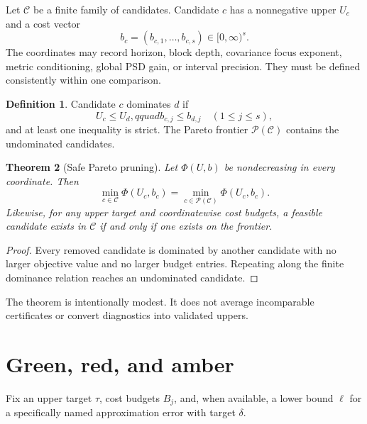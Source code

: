 \documentclass[11pt]{article}
\newtheorem{theorem}{Theorem}[section]
\theoremstyle{definition}
\newtheorem{definition}[theorem]{Definition}
\begin{document}
Let $\mathcal C$ be a finite family of candidates.  Candidate $c$ has a
nonnegative upper $U_c$ and a cost vector
\begin{equation}
 b_c=(b_{c,1},\ldots,b_{c,s})\in[0,\infty)^s.
 \label{eq:candidate}
\end{equation}
The coordinates may record horizon, block depth, covariance focus exponent,
metric conditioning, global PSD gain, or interval precision.  They must be
defined consistently within one comparison.

\begin{definition}
Candidate $c$ dominates $d$ if
\begin{equation}
 U_c\le U_d,qquad b_{c,j}\le b_{d,j}\quad(1\le j\le s),
 \label{eq:dominance}
\end{equation}
and at least one inequality is strict.  The Pareto frontier
$\mathcal P(\mathcal C)$ contains the undominated candidates.
\end{definition}

\begin{theorem}[Safe Pareto pruning]
\label{thm:pareto}
Let $\Phi(U,b)$ be nondecreasing in every coordinate.  Then
\begin{equation}
 \min_{c\in\mathcal C}\Phi(U_c,b_c)
 =\min_{c\in\mathcal P(\mathcal C)}\Phi(U_c,b_c).
 \label{eq:pareto-safe}
\end{equation}
Likewise, for any upper target and coordinatewise cost budgets, a feasible
candidate exists in $\mathcal C$ if and only if one exists on the frontier.
\end{theorem}

\begin{proof}
Every removed candidate is dominated by another candidate with no larger
objective value and no larger budget entries.  Repeating along the finite
dominance relation reaches an undominated candidate.
\end{proof}

The theorem is intentionally modest.  It does not average incomparable
certificates or convert diagnostics into validated uppers.

\section{Green, red, and amber}
\label{sec:triage}

Fix an upper target $\tau$, cost budgets $B_j$, and, when available, a lower
bound $\ell$ for a specifically named approximation error with target
$\delta$.
\end{document}
